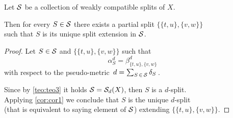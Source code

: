 \documentclass[./main.tex]{subfiles}
\begin{document}
\begin{proposition}
    Let ${\mathcal{S}}$ be a collection of weakly compatible splits of $X$.

    Then for every $S \in {\mathcal{S}}$ there exists a partial split $\bigl\{ \{t,u\},\{v,w\} \bigr\}$ \\
    \bsp such that $S$ is its unique split extension in ${\mathcal{S}}$.
\end{proposition}
\begin{proof}
    Let $S \in {\mathcal{S}}$ and $\bigl\{ \{t,u\},\{v,w\} \bigr\}$ such that
    \[ \alpha_S^d = \beta_{\{t,u\},\{v,w\}}^d \]
    with respect to the pseudo-metric $\, d = \sum_{S \,\in\, {\mathcal{S}}} \delta_S \,$.

    Since by \autoref{teo:teo3} it holds ${\mathcal{S}} = {\mathcal{S}}_d(X)$, then $S$ is a $d$-split. \\
    Applying \autoref{cor:cor1} we conclude that $S$ is the unique $d$-split \\[1pt]
    \bsp (that is equivalent to saying element of ${\mathcal{S}}$) extending $\bigl\{ \{t,u\},\{v,w\} \bigr\}$.
\end{proof}
\end{document}
